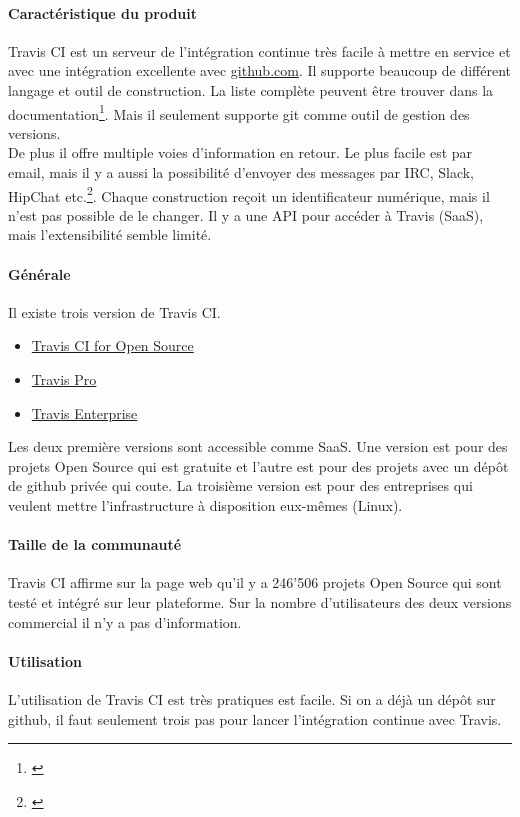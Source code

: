 \paragraph{Caractéristique du produit}
Travis CI est un serveur de l'intégration continue très facile à mettre en service et avec une intégration excellente avec \href{https://github.com/}{github.com}. Il supporte beaucoup de différent langage et outil de construction. La liste complète peuvent être trouver dans la documentation\footnote{\citep{traviscidocs}}. Mais il seulement supporte git comme outil de gestion des versions.\\
De plus il offre multiple voies d'information en retour. Le plus facile est par email, mais il y a aussi la possibilité d'envoyer des messages par IRC, Slack, HipChat etc.\footnote{\citep{traviscinotification}}. Chaque construction reçoit un identificateur numérique, mais il n'est pas possible de le changer. Il y a une API pour accéder à Travis (SaaS), mais l'extensibilité semble limité.

\paragraph{Générale}
Il existe trois version de Travis CI.
\begin{itemize}
	\item \href{https://travis-ci.org/}{Travis CI for Open Source}
	\item \href{https://travis-ci.com/}{Travis Pro}
	\item \href{https://enterprise.travis-ci.com/}{Travis Enterprise}
\end{itemize}
Les deux première versions sont accessible comme SaaS. Une version est pour des projets Open Source qui est gratuite et l'autre est pour des projets avec un dépôt de github privée qui coute. La troisième version est pour des entreprises qui veulent mettre l'infrastructure à disposition eux-mêmes (Linux).

\paragraph{Taille de la communauté}
Travis CI affirme sur la page web qu'il y a 246'506 projets Open Source qui sont testé et intégré sur leur plateforme. Sur la nombre d'utilisateurs des deux versions commercial il n'y a pas d'information.

\paragraph{Utilisation}
L'utilisation de Travis CI est très pratiques est facile. Si on a déjà un dépôt sur github, il faut seulement trois pas pour lancer l'intégration continue avec Travis.

